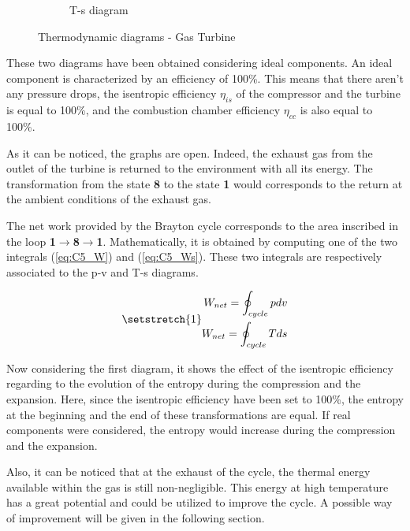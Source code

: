 \begin{figure}[H]
\begin{subfigure}[b]{0.4\textwidth}
         \caption{T-s diagram}
         \label{fig:C5_Ts_GT}
     \end{subfigure}
        \caption{Thermodynamic diagrams - Gas Turbine}
        \label{fig:C5_thermo_diagram_GT}
\end{figure}

These two diagrams have been obtained considering ideal components. An ideal component is characterized by an efficiency of 100\%. This means that there aren't any pressure drops, the isentropic efficiency $\eta_{is}$ of the compressor and the turbine is equal to 100\%, and the combustion chamber efficiency $\eta_{cc}$ is also equal to 100\%.

As it can be noticed, the graphs are open. Indeed, the exhaust gas from the outlet of the turbine is returned to the environment with all its energy. The transformation from the state \textbf{8} to the state \textbf{1} would corresponds to the return at the ambient conditions of the exhaust gas. 

The net work provided by the Brayton cycle corresponds to the area inscribed in the loop \textbf{1}$\rightarrow$\textbf{8}$\rightarrow$\textbf{1}. Mathematically, it is obtained by computing one of the two integrals (\ref{eq:C5_W}) and (\ref{eq:C5_Ws}). These two integrals are respectively associated to the p-v and T-s diagrams.

\begin{subequations}  
\setstretch{1}
\begin{align}
    W_{net} = \oint_{cycle}pdv\label{eq:C5_W}\\
    W_{net} = \oint_{cycle}Tds\label{eq:C5_Ws}
\end{align}
\end{subequations}

Now considering the first diagram, it shows the effect of the isentropic efficiency regarding to the evolution of the entropy during the compression and the expansion. Here, since the isentropic efficiency have been set to 100\%, the entropy at the beginning and the end of these transformations are equal. If real components were considered, the entropy would increase during the compression and the expansion.

Also, it can be noticed that at the exhaust of the cycle, the thermal energy available within the gas is still non-negligible. This energy at high temperature has a great potential and could be utilized to improve the cycle. A possible way of improvement will be given in the following section.

